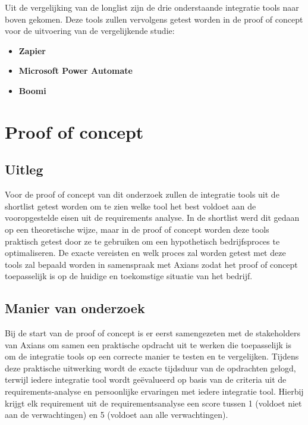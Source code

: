 \vspace{\baselineskip}

Uit de vergelijking van de longlist zijn de drie onderstaande integratie tools naar boven gekomen. Deze tools zullen vervolgens getest worden in de proof of concept voor de uitvoering van de vergelijkende studie:

\begin{itemize}
    \item \textbf{Zapier}
    \item \textbf{Microsoft Power Automate}
    \item \textbf{Boomi}
\end{itemize}




\section{Proof of concept}
\label{sec:Proof of conceptBP}

\subsection{Uitleg}
\label{sec:UitlegBP}

Voor de proof of concept van dit onderzoek zullen de integratie tools uit de shortlist getest worden om te zien welke tool het best voldoet aan de vooropgestelde eisen uit de requirements analyse. In de shortlist werd dit gedaan op een theoretische wijze, maar in de proof of concept worden deze tools praktisch getest door ze te gebruiken om een hypothetisch bedrijfsproces te optimaliseren. De exacte vereisten en welk proces zal worden getest met deze tools zal bepaald worden in samenspraak met Axians zodat het proof of concept toepasselijk is op de huidige en toekomstige situatie van het bedrijf.

\subsection{Manier van onderzoek}
\label{sec:Manier van onderzoekBP}

Bij de start van de proof of concept is er eerst samengezeten met de stakeholders van Axians om samen een praktische opdracht uit te werken die toepasselijk is om de integratie tools op een correcte manier te testen en te vergelijken. Tijdens deze praktische uitwerking wordt de exacte tijdsduur van de opdrachten gelogd, terwijl iedere integratie tool wordt geëvalueerd op basis van de criteria uit de requirements-analyse en persoonlijke ervaringen met iedere integratie tool. Hierbij krijgt elk requirement uit de requirementsanalyse een score tussen 1 (voldoet niet aan de verwachtingen) en 5 (voldoet aan alle verwachtingen).

